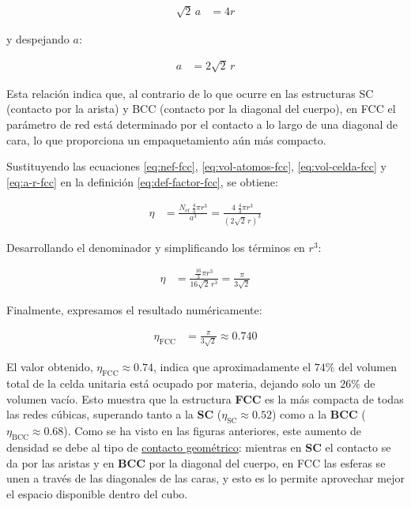 \documentclass{article}
\begin{document}
\begin{equation}
\begin{split}
\sqrt{2}\,a &= 4r
\end{split} \label{eq:contacto-fcc}
\end{equation}

y despejando \(a\):

\begin{equation}
\begin{split}
a &= 2\sqrt{2}\,r
\end{split} \label{eq:a-r-fcc}
\end{equation}

Esta relación indica que, al contrario de lo que ocurre en las estructuras SC (contacto por la arista) y BCC (contacto por la diagonal del cuerpo), en FCC el parámetro de red está determinado por el contacto a lo largo de una diagonal de cara, lo que proporciona un empaquetamiento aún más compacto.

Sustituyendo las ecuaciones \eqref{eq:nef-fcc}, \eqref{eq:vol-atomos-fcc}, \eqref{eq:vol-celda-fcc} y \eqref{eq:a-r-fcc} en la definición \eqref{eq:def-factor-fcc}, se obtiene:

\begin{equation}
\begin{split}
\eta &= \frac{N_{\text{ef}}\;\frac{4}{3}\pi r^{3}}{a^{3}}
     = \frac{4\;\frac{4}{3}\pi r^{3}}{(2\sqrt{2}\,r)^{3}}
\end{split} \label{eq:eta-fcc-paso1}
\end{equation}

Desarrollando el denominador y simplificando los términos en \(r^{3}\):

\begin{equation}
\begin{split}
\eta &= \frac{\frac{16}{3}\pi r^{3}}{16\sqrt{2}\,r^{3}}
     = \frac{\pi}{3\sqrt{2}}
\end{split} \label{eq:eta-fcc-paso2}
\end{equation}

Finalmente, expresamos el resultado numéricamente:

\begin{equation}
\begin{split}
\eta_{\text{FCC}} &= \frac{\pi}{3\sqrt{2}} \approx \boxed{0.740}
\end{split} \label{eq:eta-fcc-num}
\end{equation}

El valor obtenido, \(\boxed{\eta_{\text{FCC}}\approx 0.74}\), indica que aproximadamente el \(74\%\) del volumen total de la celda unitaria está ocupado por materia, dejando solo un \(26\%\) de volumen vacío.  
Esto muestra que la estructura \textbf{FCC} es la más compacta de todas las redes cúbicas, superando tanto a la \textbf{SC} (\(\eta_{\text{SC}}\approx 0.52\)) como a la \textbf{BCC} (\(\eta_{\text{BCC}}\approx 0.68\)).  
Como se ha visto en las figuras anteriores, este aumento de densidad se debe al tipo de \underline{contacto geométrico}: mientras en\textbf{ SC} el contacto se da por las aristas y en \textbf{BCC} por la diagonal del cuerpo, en FCC las esferas se unen a través de las diagonales de las caras, y esto es lo permite aprovechar mejor el espacio disponible dentro del cubo.
\end{document}
